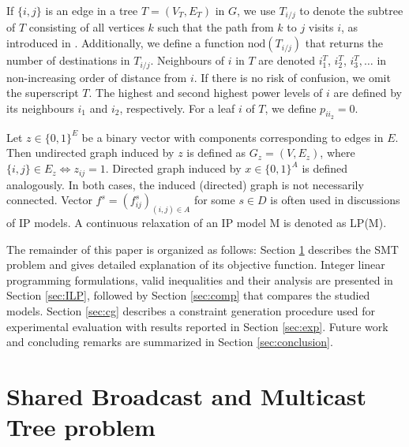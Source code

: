 If $\{i,j\}$ is an edge in a tree $T=(V_T,E_T)$ in $G$, we use $T_{i/j}$ to denote the subtree of $T$ consisting of all vertices $k$ such that the path from $k$ to $j$ visits $i$, as introduced in \cite{Haugland12Dual}. Additionally, we define a function $\text{nod}(T_{i/j})$ that returns the number of destinations in $T_{i/j}$. Neighbours of $i$ in $T$ are denoted $i^T_1$, $i^T_2$, $i^T_3, \dots$ in non-increasing order of distance from $i$. If there is no risk of confusion, we omit the superscript $T$. The highest and second highest power levels of $i$ are defined by its neighbours $i_1$ and $i_2$, respectively. For a leaf $i$ of $T$, we define $p_{ii_2}=0$.

Let $z \in \{0,1\}^E$ be a binary vector with components corresponding to edges in $E$. Then undirected graph induced by $z$ is defined as  $G_z=(V,E_z)$, where $\{i,j\}\in E_z\Leftrightarrow z_{ij}=1$. Directed graph induced by $x \in \{0,1\}^A$ is defined analogously. In both cases, the induced (directed) graph is not necessarily connected. Vector $f^s=(f^s_{ij})_{(i,j)\in A}$ for some $s\in D$ is often used in discussions of IP models. A continuous relaxation of an IP model M is denoted as LP(M).

The remainder of this paper is organized as follows: Section \ref{sec:SBT} describes the SMT problem and gives detailed explanation of its objective function. Integer linear programming formulations, valid inequalities and their analysis are presented in Section \ref{sec:ILP}, followed by Section \ref{sec:comp} that compares the studied models. Section \ref{sec:cg} describes a constraint generation procedure used for experimental evaluation with results reported in Section \ref{sec:exp}. Future work and concluding remarks are summarized in Section \ref{sec:conclusion}.
\section{Shared Broadcast and Multicast Tree problem}
\label{sec:SBT}

